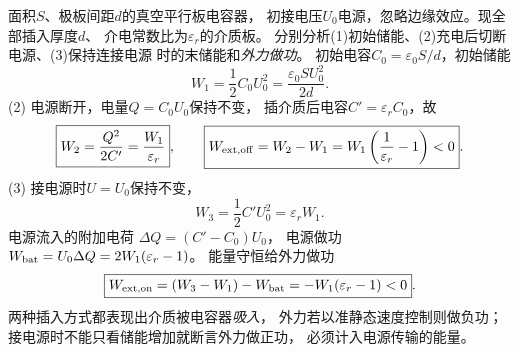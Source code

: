\problemtext 面积$S$、极板间距$d$的真空平行板电容器，
初接电压$U_0$电源，忽略边缘效应。现全部插入厚度$d$、
介电常数比为$\varepsilon_r$的介质板。
分别分析(1)初始储能、(2)充电后切断电源、(3)保持连接电源
时的末储能和\emph{外力做功}。
\workings
初始电容$C_0=\varepsilon_0S/d$，初始储能
\[
\boxed{W_1=\frac12C_0U_0^2=\frac{\varepsilon_0SU_0^2}{2d}}.
\]
(2) 电源断开，电量$Q=C_0U_0$保持不变，
插介质后电容$C'=\varepsilon_rC_0$，故
\[
\boxed{W_2=\frac{Q^2}{2C'}=\frac{W_1}{\varepsilon_r}},
\qquad
\boxed{W_{\rm ext,off}=W_2-W_1
=W_1\left(\frac1{\varepsilon_r}-1\right)<0}.
\]
(3) 接电源时$U=U_0$保持不变，
\[
\boxed{W_3=\frac12C'U_0^2=\varepsilon_r W_1}.
\]
电源流入的附加电荷
$\Delta Q=(C'-C_0)U_0$，
电源做功$W_{\rm bat}=U_0\Delta Q
=2W_1(\varepsilon_r-1)$。
能量守恒给外力做功
\[
\boxed{W_{\rm ext,on}=(W_3-W_1)-W_{\rm bat}
=-W_1(\varepsilon_r-1)<0}.
\]
\crosscheck 两种插入方式都表现出介质被电容器\emph{吸入}，
外力若以准静态速度控制则做负功；
接电源时不能只看储能增加就断言外力做正功，
必须计入电源传输的能量。
